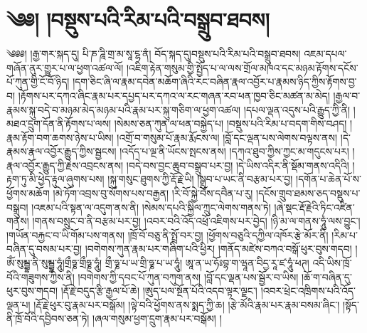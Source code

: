\setcounter{footnote}{0} 
\chapter{༄༅། །བསྡུས་པའི་རིམ་པའི་བསྒྲུབ་ཐབས།}༄༅༅། །རྒྱ་གར་སྐད་དུ། པི་ཎ་ཌཱི་གྲ་མ་སཱ་ངྷ་ནཾ། བོད་སྐད་དུ།བསྡུས་པའི་རིམ་པའི་བསྒྲུབ་ཐབས། འཇམ་དཔལ་གཞོན་ནུར་གྱུར་པ་ལ་ཕྱག་འཚལ་ལོ། །འཇིག་རྟེན་གསུམ་གྱི་སྤྱོད་པ་ལ་ལས་གྲོལ་མཁའ་དང་མཉམ་རྟོགས་དངོས་པོ་ཀུན་གྱི་ངོ་བོ་ཉིད། །དག་ཅིང་ཞི་ལ་རྣམ་དབེན་མཆོག་ཞིའི་རང་བཞིན་རྣལ་འབྱོར་པ་རྣམས་ཉིད་ཀྱིས་རྟོགས་བྱ་བ། །རྟོགས་པར་དཀའ་ཞིང་རྣམ་པར་དཔྱད་པར་དཀའ་ལ་རང་གཞན་རབ་ཕན་ཁྱབ་ཅིང་མཚན་མ་མེད། །རྒྱལ་བ་རྣམས་སྐུ་བདེ་བ་མཉམ་མེད་མཉམ་པའི་རྣམ་པར་སྐུ་གཅིག་ལ་ཕྱག་འཚལ། །དཔལ་ལྡན་འདུས་པའི་རྒྱུད་ཀྱི་ནི། །མཐའ་དྲུག་དོན་ནི་རྟོགས་པ་ལས། །སེམས་ཅན་ཀུན་ལ་ཕན་བསྐྱེད་པ། །བསྡུས་པའི་རིམ་པ་བདག་གིས་བཤད། །རྣམ་རྟོག་བག་ཆགས་ཉེས་པ་ཡིས། །འགྲོ་བ་གསུམ་པོ་རྣམ་རྨོངས་ལ། །བློ་དང་ལྡན་པས་ལེགས་བལྟས་ནས། །དེ་རྣམས་རྣལ་འབྱོར་རྒྱུད་ཀྱིས་སྦྱངས། །འདོད་པ་ལྔ་ནི་ཡོངས་སྤངས་ནས། །དཀའ་ཐུབ་ཀྱིས་ཀྱང་མ་གདུངས་པར། །རྣལ་འབྱོར་རྒྱུད་ཀྱི་རྗེས་འབྲངས་ནས། །བདེ་བས་བྱང་ཆུབ་བསྒྲུབ་པར་བྱ། །དེ་ཡིས་འདིར་ནི་སྡོམ་གནས་འདིའི། །རྟག་ཏུ་མི་ཕྱེད་རྟུལ་ཞུགས་པས། །སྐུ་གསུང་ཐུགས་ཀྱི་རྡོ་རྗེ་ཡི། །སྒྲུབ་པ་ཡང་ནི་བརྩམ་པར་བྱ། །དགོན་པ་ཆེན་པོ་ས་ཕྱོགས་མཆོག །མེ་ཏོག་འབྲས་བུ་སོགས་པས་བརྒྱན། །རི་བོ་སྐྱེ་བོས་དབཻན་པ་རུ། །དངོས་གྲུབ་ཐམས་ཅད་བསྡུས་པ་བསྒྲུབ། །འཇམ་པའི་སྟན་ལ་འདུག་ནས་ནི། །སེམས་དཔའི་སྐྱིལ་ཀྲུང་ལེགས་གནས་ཏེ། །ཞེ་སྡང་རྡོ་རྗེའི་ཏིང་འཛིན་གནས། །གནས་བསྲུང་བ་ནི་བརྩམ་པར་བྱ། །འབར་བའི་འོད་འཕྲོ་འཇིགས་པར་བྱེད། །ཉི་མ་ལ་གནས་ཧཱུཾ་ལས་བྱུང་། །གཡོན་བརྐྱང་བ་ཡི་གོམ་པས་གནས། །ཁྲོ་བོ་བཅུ་ནི་སྤྲོ་བར་བྱ། །ཕྱོགས་བཅུའི་དཀྱིལ་འཁོར་རྩེ་མོར་ནི། །རིམ་པ་བཞིན་དུ་བསམ་པར་བྱ། །བགེགས་ཀུན་རྣམ་པར་གཞིག་པའི་ཕྱིར། །གནོད་མཛེས་བཀའ་བསྒོ་ཕུར་བུས་གདབ། །ཨོཾ་སུམྦྷ་ནི་སུམྦྷ་ཧཱུཾ།གྲྀཧྞ་གྲྀཧྞ་ཧཱུཾ། གྲྀ་ཧྞ་པ་ཡ་གྲི་ཧྞ་པ་ཡ་ཧཱུཾ། ཨཱ་ན་ཡ་ཧོཿབྷ་ག་ཝཱན་བིདྱ་རཱ་ཛ་ཧཱུཾ་ཕཊ། འདི་ཡིས་ཁྲོ་བོའི་གཟུགས་ཀྱིས་ནི། །བགེགས་ཀྱི་དབང་པོ་ཀུན་བཀུག་ནས། །བློ་དང་ལྡན་པས་སྦྱོར་བ་ཡིས། །ཆོ་ག་བཞིན་དུ་ཕུར་བུས་གདབ། །རྡོ་རྗེ་བདུད་རྩི་རྒྱལ་པོ་ཆེ། །ཨུད་པལ་སྔོན་པོའི་འདབ་ལྟར་ལྗང་། །འབར་ཕྲེང་འཁྲིགས་པའི་འོད་ལྡན་པ། །རྡོ་རྗེ་ཕུར་བུ་རྣམ་པར་བསྒོམ། །ལྟེ་བའི་ཕྱོགས་ནས་སྨད་ཀྱི་ཆ། །རྩེ་མོའི་རྣམ་པར་རྣམ་བསམ་ཞིང་། །སྟོད་ནི་ཁྲོ་བོའི་དབྱིབས་ཅན་ཏེ། །ཞལ་གསུམ་ཕྱག་དྲུག་རྣམ་པར་བསྒོམ། །
